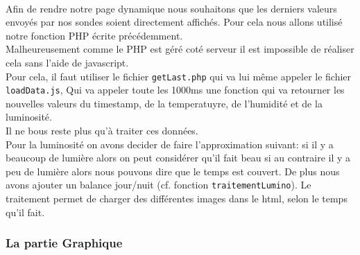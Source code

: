 \documentclass[a4paper, titlepage, oneside, 12pt]{article}%
\begin{document}
\paragraph{}
Afin de rendre notre page dynamique nous souhaitons que les derniers valeurs envoyés par nos sondes soient directement affichés. Pour cela nous allons utilisé notre fonction PHP écrite précédemment.\\
Malheureusement comme le PHP est géré coté serveur il est impossible de réaliser cela sans l'aide de javascript.\\
Pour cela, il faut utiliser le fichier \texttt{getLast.php} qui va lui même appeler le fichier \texttt{loadData.js}, Qui va appeler toute les 1000ms une fonction qui va retourner les nouvelles valeurs du timestamp, de la temperatuyre, de l'humidité et de la luminosité.\\
Il ne bous reste plus qu'à traiter ces données.\\
Pour la luminosité on avons decider de faire l'approximation suivant: si il y a beaucoup de lumière alors on peut considérer qu'il fait beau si au contraire il y a peu de lumière alors nous pouvons dire que le temps est couvert. De plus nous avons ajouter un balance jour/nuit (cf. fonction \texttt{traitementLumino}).
Le traitement permet de charger des différentes images dans le html, selon le temps qu'il fait.

\subsubsection{La partie Graphique}
\end{document}
